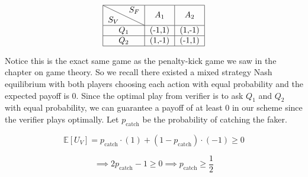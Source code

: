 \[
\begin{tabular}{|c|c|c|}
\hline
\diagbox {$S_V$}{$S_F$} & $A_1$ & $A_2$ \\
\hline
$Q_1$ & (-1,1) & (1,-1) \\
\hline
$Q_2$ & (1,-1) & (-1,1) \\
\hline
\end{tabular}
\]

Notice this is the exact same game as the penalty-kick game we saw in the chapter on game theory. So 
we recall there existed a mixed strategy Nash equilibrium with both players choosing each action with 
equal probability and the expected payoff is 0. Since the optimal play from verifier is to ask $Q_1$ and 
$Q_2$ with equal probability, we can guarantee a payoff of at least 0 in our scheme since the 
verifier plays optimally. Let $p_{\text{catch}}$ be the probability of catching the faker.

\[
\mathbb E[U_V] =  p_{\text{catch}} \cdot (1) + (1-p_{\text{catch}}) \cdot (-1) \ge 0
\]

\[
\implies 
2p_{\text{catch}}-1 \ge 0
\implies 
p_{\text{catch}} \ge \frac{1}{2}
\]

